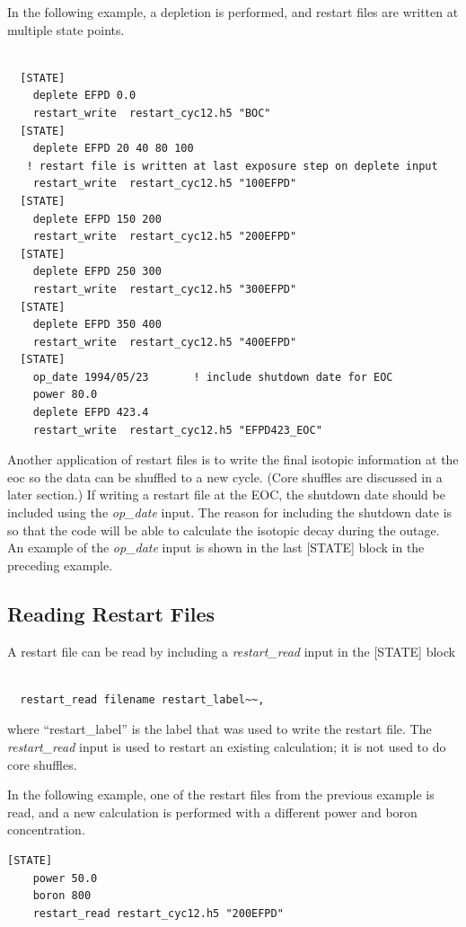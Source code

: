 In the following example, a depletion is performed, and restart files are written at multiple state points.
\begin{Verbatim}[fontsize=\small]

  [STATE]
    deplete EFPD 0.0
    restart_write  restart_cyc12.h5 "BOC"
  [STATE]
    deplete EFPD 20 40 80 100
   ! restart file is written at last exposure step on deplete input
    restart_write  restart_cyc12.h5 "100EFPD"
  [STATE]
    deplete EFPD 150 200
    restart_write  restart_cyc12.h5 "200EFPD"
  [STATE]
    deplete EFPD 250 300
    restart_write  restart_cyc12.h5 "300EFPD"
  [STATE]
    deplete EFPD 350 400
    restart_write  restart_cyc12.h5 "400EFPD"
  [STATE]
    op_date 1994/05/23       ! include shutdown date for EOC
    power 80.0
    deplete EFPD 423.4
    restart_write  restart_cyc12.h5 "EFPD423_EOC"

\end{Verbatim}

Another application of restart files is to write the final isotopic information at the \ac{eoc}
so the data can be shuffled to a new cycle. (Core shuffles are discussed in a later section.)
If writing a restart file at the EOC, the shutdown date should be included using the {\it op\_date} input.
The reason for including the shutdown date is so that the code will be able to calculate the isotopic decay
during the outage. An example of the {\it op\_date} input is shown in the last [STATE] block in the preceding example.


\subsection{Reading Restart Files}

A restart file can be read by including a {\it restart\_read} input in the [STATE] block
\begin{Verbatim}[fontsize=\small]

  restart_read filename restart_label~~,

\end{Verbatim}
where ``restart\_label'' is the label that was used to write the restart file.
The {\it restart\_read} input is used to restart an existing calculation; it is
not used to do core shuffles.

In the following example, one of the restart files from the previous example
is read, and a new calculation is performed with a different power and boron concentration.
\begin{Verbatim}[fontsize=\small]
  [STATE]
    power 50.0
    boron 800
    restart_read restart_cyc12.h5 "200EFPD"

\end{Verbatim}

